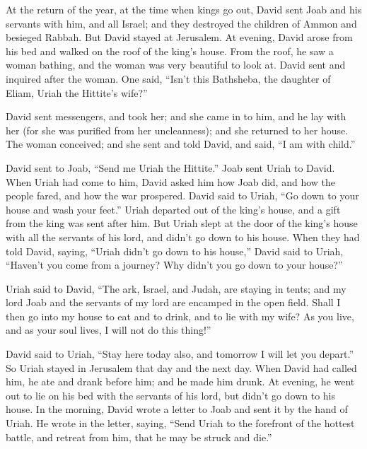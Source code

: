 \mychapter{} \myverse*{}At the return of the year, at the time when kings go out, David
sent Joab and his servants with him, and all Israel; and they destroyed the children of Ammon and besieged
Rabbah. But David stayed at Jerusalem.
\myverse{}At evening, David arose from his bed and walked on the roof of the king’s house.
From the roof, he saw a woman bathing, and the woman was very beautiful to look at.
\myverse{}David sent and inquired after the woman. One said, “Isn’t this Bathsheba, the
daughter of Eliam, Uriah the Hittite’s wife?”

\myverse{}David sent messengers, and took her; and she came in to him, and
he lay with her (for she was purified from her uncleanness); and she returned to her house.
\myverse{}The woman conceived; and she sent and told David, and said, “I am with child.”

\myverse{}David sent to Joab, “Send me Uriah the Hittite.” Joab sent Uriah
to David.
\myverse{}When Uriah had come to him, David asked him how Joab did, and how the people
fared, and how the war prospered.
\myverse{}David said to Uriah, “Go down to your house and wash your feet.” Uriah departed
out of the king’s house, and a gift from the king was sent after him.
\myverse{}But Uriah slept at the door of the king’s house with all the servants of his
lord, and didn’t go down to his house.
\myverse{}When they had told David, saying, “Uriah didn’t go down to his house,” David
said to Uriah, “Haven’t you come from a journey? Why didn’t you go down to your house?”

\myverse{}Uriah said to David, “The ark, Israel, and Judah, are staying
in tents; and my lord Joab and the servants of my lord are encamped in the open field. Shall I then go
into my house to eat and to drink, and to lie with my wife? As you live, and as your soul lives, I will
not do this thing!”

\myverse{}David said to Uriah, “Stay here today also, and tomorrow I will
let you depart.” So Uriah stayed in Jerusalem that day and the next day.
\myverse{}When David had called him, he ate and drank before him; and he made him drunk.
At evening, he went out to lie on his bed with the servants of his lord, but didn’t go down to his house.
\myverse{}In the morning, David wrote a letter to Joab and sent it by the hand of Uriah.
\myverse{}He wrote in the letter, saying, “Send Uriah to the forefront of the hottest
battle, and retreat from him, that he may be struck and die.”

